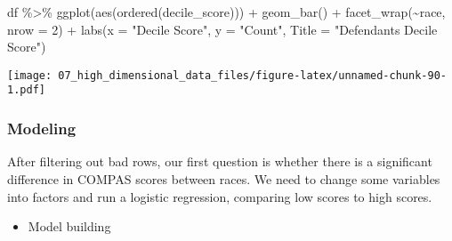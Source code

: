 \documentclass[
]{book}
\newenvironment{Shaded}{\begin{snugshade}}{\end{snugshade}}
\newcommand{\AttributeTok}[1]{\textcolor[rgb]{0.77,0.63,0.00}{#1}}
\newcommand{\DecValTok}[1]{\textcolor[rgb]{0.00,0.00,0.81}{#1}}
\newcommand{\FunctionTok}[1]{\textcolor[rgb]{0.00,0.00,0.00}{#1}}
\newcommand{\NormalTok}[1]{#1}
\newcommand{\SpecialCharTok}[1]{\textcolor[rgb]{0.00,0.00,0.00}{#1}}
\newcommand{\StringTok}[1]{\textcolor[rgb]{0.31,0.60,0.02}{#1}}
\providecommand{\tightlist}{%
  \setlength{\itemsep}{0pt}\setlength{\parskip}{0pt}}
\begin{document}
\begin{Shaded}
\begin{Highlighting}[]
\NormalTok{df }\SpecialCharTok{\%\textgreater{}\%}
  \FunctionTok{ggplot}\NormalTok{(}\FunctionTok{aes}\NormalTok{(}\FunctionTok{ordered}\NormalTok{(decile\_score))) }\SpecialCharTok{+} 
          \FunctionTok{geom\_bar}\NormalTok{() }\SpecialCharTok{+}
          \FunctionTok{facet\_wrap}\NormalTok{(}\SpecialCharTok{\textasciitilde{}}\NormalTok{race, }\AttributeTok{nrow =} \DecValTok{2}\NormalTok{) }\SpecialCharTok{+}
          \FunctionTok{labs}\NormalTok{(}\AttributeTok{x =} \StringTok{"Decile Score"}\NormalTok{,}
               \AttributeTok{y =} \StringTok{"Count"}\NormalTok{,}
               \AttributeTok{Title =} \StringTok{"Defendant\textquotesingle{}s Decile Score"}\NormalTok{)}
\end{Highlighting}
\end{Shaded}

\texttt{[image: 07\_high\_dimensional\_data\_files/figure-latex/unnamed-chunk-90-1.pdf]}

\hypertarget{modeling}{%
\subsubsection{Modeling}\label{modeling}}

After filtering out bad rows, our first question is whether there is a significant difference in COMPAS scores between races. We need to change some variables into factors and run a logistic regression, comparing low scores to high scores.

\begin{itemize}
\tightlist
\item
  Model building
\end{itemize}
\end{document}
